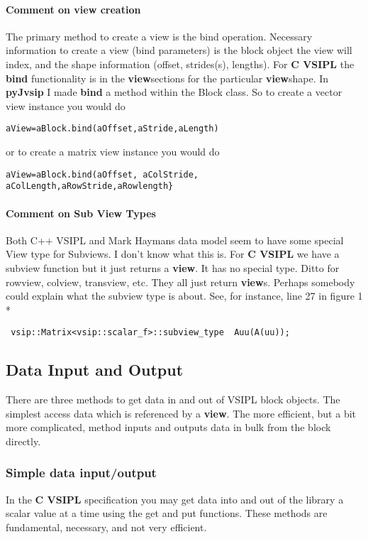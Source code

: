 \documentclass[11pt, oneside]{article}
\newcommand{\cvl}{\ttbf{C VSIPL}}
\newcommand{\pyjv}{{\ttbf{pyJvsip}}}
\newcommand{\ttbf}[1]{{\ttfamily \bfseries #1}}
\newcommand{\vw}{\ttbf{view}}
\begin{document}
\paragraph{Comment on view creation} The primary method to create a view is the bind operation. Necessary information to create a view (bind parameters) is the block object the view will index, and the shape information (offset, strides(s), lengths). For \cvl{} the \ttbf{bind} functionality is in the \vw sections for the particular \vw shape. In \pyjv{} I made \ttbf{bind} a method within the Block class. So to create a vector view instance you would do 
\begin{verbatim}
aView=aBlock.bind(aOffset,aStride,aLength)
\end{verbatim}
or to create a matrix view instance you would do 
\begin{verbatim}
aView=aBlock.bind(aOffset, aColStride, aColLength,aRowStride,aRowlength}
 \end{verbatim}
\paragraph{Comment on Sub View Types} Both C++ VSIPL and Mark Haymans data model seem to have some special View type for Subviews. I don't know what this is. For \cvl{} we have a subview function but it just returns a \vw{}. It has no special type. Ditto for rowview, colview, transview, etc.  They all just return \vw{}s. Perhaps somebody could explain what the subview type is about.  See, for instance, line 27 in figure 1\\*
\begin{verbatim}
 vsip::Matrix<vsip::scalar_f>::subview_type  Auu(A(uu));
 \end{verbatim}
\subsection{Data Input and Output}
There are three methods to get data in and out of VSIPL block objects. The simplest access data which is referenced by a \vw. The more efficient, but a bit more complicated, method inputs and outputs data in bulk from the block directly. 
\subsubsection{Simple data input/output}
In the \cvl{} specification you may get data into and out of the library a scalar value at a time using the get and put functions. These methods are fundamental, necessary, and not very efficient.
\end{document}

